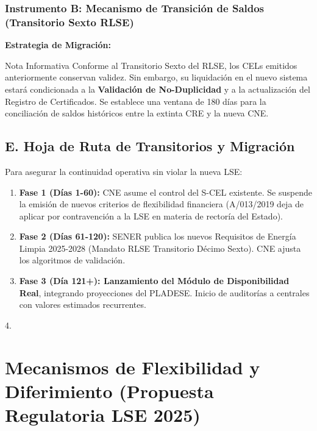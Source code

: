 \documentclass{cel}
\begin{document}
\subsubsection{Instrumento B: Mecanismo de Transición de Saldos (Transitorio Sexto RLSE)}
\nopagebreak

\textbf{Estrategia de Migración:}


\vspace{0.2cm}
\begin{glowBox}[gobmxDorado]{Nota Informativa}
\textquotedbl{}Conforme al Transitorio Sexto del RLSE, los CELs emitidos anteriormente conservan validez. Sin embargo, su liquidación en el nuevo sistema estará condicionada a la \textbf{Validación de No-Duplicidad} y a la actualización del Registro de Certificados. Se establece una ventana de 180 días para la conciliación de saldos históricos entre la extinta CRE y la nueva CNE.\textquotedbl{}
\end{glowBox}


\subsection{E. Hoja de Ruta de Transitorios y Migración}
\nopagebreak

Para asegurar la continuidad operativa sin violar la nueva LSE:


\begin{enumerate}
\item \textbf{Fase 1 (Días 1-60):} CNE asume el control del S-CEL existente. Se suspende la emisión de nuevos criterios de flexibilidad financiera (A/013/2019 deja de aplicar por contravención a la LSE en materia de rectoría del Estado).
\item \textbf{Fase 2 (Días 61-120):} SENER publica los nuevos Requisitos de Energía Limpia 2025-2028 (Mandato RLSE Transitorio Décimo Sexto). CNE ajusta los algoritmos de validación.
\item \textbf{Fase 3 (Día 121+): \textbf{ Lanzamiento del }Módulo de Disponibilidad Real}, integrando proyecciones del PLADESE. Inicio de auditorías a centrales con \textquotedbl{}valores estimados\textquotedbl{} recurrentes.
\end{enumerate}
4.


{}
\section*{Mecanismos de Flexibilidad y Diferimiento (Propuesta Regulatoria LSE 2025)}
\nopagebreak
\end{document}
